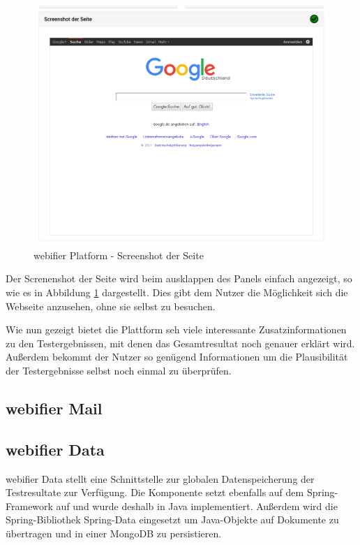 \begin{figure}[H]
  \centering
  \includegraphics[width=\textwidth]{images/platform/screenshot-clean}
  \caption{webifier Platform - Screenshot der Seite}
  \label{fig:platform-result-screenshot}
\end{figure}

Der Screnenshot der Seite wird beim ausklappen des Panels einfach angezeigt, so wie es in Abbildung \ref{fig:platform-result-screenshot} dargestellt. Dies gibt dem Nutzer die Möglichkeit sich die Webseite anzusehen, ohne sie selbst zu besuchen.

Wie nun gezeigt bietet die Plattform seh viele interessante Zusatzinformationen zu den Testergebnissen, mit denen das Gesamtresultat noch genauer erklärt wird. Außerdem bekommt der Nutzer so genügend Informationen um die Plausibilität der Testergebnisse selbst noch einmal zu überprüfen.

\subsection{webifier Mail}


\subsection{webifier Data}
\label{sec:umsetzung-data}

webifier Data stellt eine Schnittstelle zur globalen Datenspeicherung der Testresultate zur Verfügung. Die Komponente setzt ebenfalls auf dem Spring-Framework auf und wurde deshalb in Java implementiert. Außerdem wird die Spring-Bibliothek Spring-Data eingesetzt um Java-Objekte auf Dokumente zu übertragen und in einer MongoDB zu persistieren.

